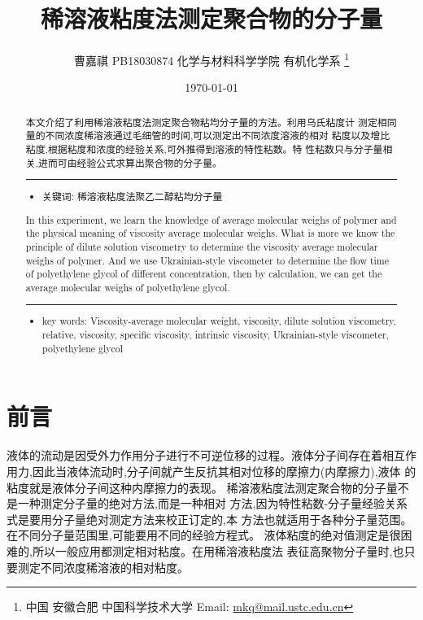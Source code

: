 \documentclass[11pt]{report}
\author{曹嘉祺 PB18030874 化学与材料科学学院 有机化学系 \thanks{中国 安徽合肥 中国科学技术大学 Email: \href{mailto:mkq@mail.ustc.edu.cn}{mkq@mail.ustc.edu.cn}}}
\date{\today}
\title{稀溶液粘度法测定聚合物的分子量}
\begin{document}
\maketitle
\tableofcontents

\begin{abstract}
本文介绍了利用稀溶液粘度法测定聚合物粘均分子量的方法。利用乌氏粘度计
测定相同量的不同浓度稀溶液通过毛细管的时间,可以测定出不同浓度溶液的相对
粘度以及增比粘度,根据粘度和浓度的经验关系,可外推得到溶液的特性粘数。特
性粘数只与分子量相关,进而可由经验公式求算出聚合物的分子量。

\noindent\rule{\textwidth}{0.5pt}
\begin{itemize}
\item 关键词: 稀溶液\quad 粘度法\quad 聚乙二醇\quad 粘均分子量
\end{itemize}
\end{abstract}




\begin{abstract}


In this experiment, we learn the knowledge of average molecular weighs of polymer and
the physical meaning of viscosity average molecular weighs. What is more we know the principle of dilute
solution viscometry to determine the viscosity average molecular weighs of polymer. And we use
Ukrainian-style viscometer to determine the flow time of polyethylene glycol of different concentration,
then by calculation, we can get the average molecular weighs of polyethylene glycol.



\noindent\rule{\textwidth}{0.5pt}

\begin{itemize}
\item key words:  Viscosity-average molecular weight, viscosity, dilute solution viscometry, relative, viscosity, specific viscosity, intrinsic viscosity, Ukrainian-style viscometer, polyethylene glycol
\end{itemize}
\end{abstract}
\part{前言}
\label{sec:orgc07c2bc}
  液体的流动是因受外力作用分子进行不可逆位移的过程。液体分子间存在着相互作
用力,因此当液体流动时,分子间就产生反抗其相对位移的摩擦力(内摩擦力),液体
的粘度就是液体分子间这种内摩擦力的表现。
稀溶液粘度法测定聚合物的分子量不是一种测定分子量的绝对方法,而是一种相对
方法,因为特性粘数-分子量经验关系式是要用分子量绝对测定方法来校正订定的,本
方法也就适用于各种分子量范围。在不同分子量范围里,可能要用不同的经验方程式。
液体粘度的绝对值测定是很困难的,所以一般应用都测定相对粘度。在用稀溶液粘度法
表征高聚物分子量时,也只要测定不同浓度稀溶液的相对粘度。
\end{document}
